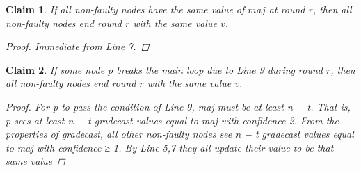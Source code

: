 \documentclass[conference]{IEEEtran}
\newtheorem{claim*}{Claim}
\begin{document}
\begin{appendices}
\begin{claim*}
If all non-faulty nodes have the same value of $maj$ at round $r$, then all non-faulty nodes end round $r$ with the same value $v$.
\begin{proof}
Immediate from Line 7.
\end{proof}
\end{claim*}

\begin{claim*}
If some node $p$ breaks the main loop due to Line 9 during round $r$, then all non-faulty nodes end round $r$ with the same value $v$.

\begin{proof}
For p to pass the condition of Line 9, maj must be at least n − t. That is, p sees at
least n − t gradecast values equal to maj with confidence 2. From the properties of gradecast, all
other non-faulty nodes see n − t gradecast values equal to maj with confidence ≥ 1. By Line 5,7
they all update their value to be that same value
\end{proof}

\end{claim*}

\end{appendices}
\end{document}
